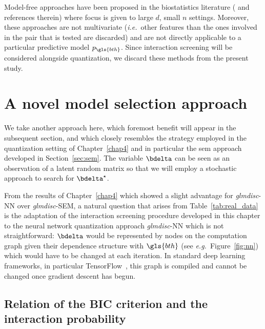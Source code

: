 Model-free approaches have been proposed in the biostatistics literature (\cite{yang2008snpharvester,zhang2010team,li2013model,dong2008exploration,zhang2007bayesian,wan2010boost} and references therein) where focus is given to large $d$, small $n$ settings. Moreover, these approaches are not multivariate (\textit{i.e.}\ other features than the ones involved in the pair that is tested are discarded) and are not directly applicable to a particular predictive model $p_{\gls{bth}}$. Since interaction screening will be considered alongside quantization, we discard these methods from the present study.

\section{A novel model selection approach}

We take another approach here, which foremost benefit will appear in the subsequent section, and which closely resembles the strategy employed in the quantization setting of Chapter~\ref{chap4} and in particular the \gls{sem} approach developed in Section~\ref{sec:sem}. The variable $\bdelta$ can be seen as an observation of a latent random matrix so that we will employ a stochastic approach to search for $\bdelta^\star$.

From the results of Chapter~\ref{chap4} which showed a slight advantage for \textit{glmdisc}-NN over \textit{glmdisc}-SEM, a natural question that arises from Table~\ref{tab:real_data} is the adaptation of the interaction screening procedure developed in this chapter to the neural network quantization approach \textit{glmdisc}-NN which is not straightforward: $\bdelta$ would be represented by nodes on the computation graph given their dependence structure with $\gls{bth}$ (see \textit{e.g.}\ Figure~\ref{fig:nn}) which would have to be changed at each iteration. In standard deep learning frameworks, in particular TensorFlow~\cite{tensorflow2015-whitepaper}, this graph is compiled and cannot be changed once gradient descent has begun.


\subsection{Relation of the BIC criterion and the interaction probability}

